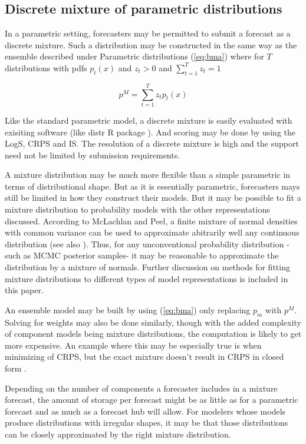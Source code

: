 \documentclass{article}\usepackage[]{graphicx}\usepackage[]{color}
\begin{document}
\subsection{Discrete mixture of parametric distributions}
In a parametric setting, forecasters may be permitted to submit a forecast as a
discrete mixture. Such a distribution may be constructed in the same way as the
ensemble described under Parametric distributions (\ref{eq:bma}) 
where for $T$ distributions
with pdfs $p_t(x)$ and $z_t > 0$ and $\sum_{t=1}^{T} z_t = 1$
 

\begin{equation}
\label{eq:dmd}
  p^{M} = \sum_{t=1}^T z_tp_t(x)
\end{equation}




Like the standard parametric model, a discrete mixture is easily evaluated with
exisiting software (like distr R package \cite{camphausen2007distr}). And 
scoring may be done by 
using the LogS, CRPS and IS. The resolution of a discrete mixture is high 
and the support need not be limited by submission requirements. 

A mixture distribution may be much more flexible than a simple parametric in 
terms of distributional shape. But as it is essentially parametric, forecasters
mays still be limited in how they construct their models. But it may be possible
to fit a mixture distribution to probability models with the other 
representations discussed. According to McLachlan and Peel, a finite mixture of 
normal densities with common variance can be used to approximate abitrarily well
any continuous distribution \cite{peel2000finite} (see also 
\cite{nguyen2019approximations}). Thus, for any unconventional probability
distribution -such as MCMC posterior samples- it may be reasonable to 
approximate the distribution by a mixture of normals.
Further discussion on methods for fitting mixture 
distributions to different types of model representations is included in this 
paper.

An ensemble model may be built by using (\ref{eq:bma}) only replacing $p_m$
with $p^M$. Solving for weights may also be done similarly, though with the 
added complexity of component models being mixture distributions, the 
computation is likely to get more expensive. An example where this may be
especially true is when minimizing of CRPS, but the exact mixture doesn't 
result in CRPS in closed form \cite{baran2018combining}.

Depending on the number of components a forecaster includes in a mixture 
forecast, the amount of storage per forecast might be as little as for a 
parametric forecast and as much as a forecast hub will allow. For modelers whose
models produce distributions with irregular shapes, it may be that those
distributions can be closely approximated by the right mixture distribution.
\end{document}
